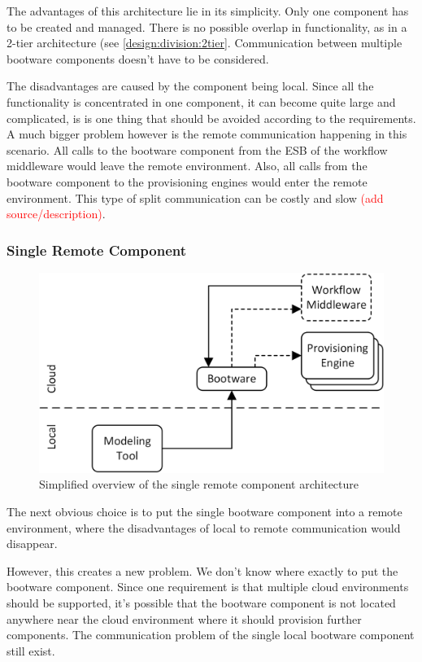 The advantages of this architecture lie in its simplicity.
Only one component has to be created and managed.
There is no possible overlap in functionality, as in a 2-tier architecture (see \autoref{design:division:2tier}.
Communication between multiple bootware components doesn't have to be considered.

The disadvantages are caused by the component being local.
Since all the functionality is concentrated in one component, it can become quite large and complicated, is is one thing that should be avoided according to the requirements.
A much bigger problem however is the remote communication happening in this scenario.
All calls to the bootware component from the ESB of the workflow middleware would leave the remote environment.
Also, all calls from the bootware component to the provisioning engines would enter the remote environment.
This type of split communication can be costly and slow \textcolor{red}{(add source/description)}.

\subsubsection{Single Remote Component}

\begin{figure}[!htbp]
	\centering
	\includegraphics[resolution=600]{design/assets/simple_remote}
	\caption{Simplified overview of the single remote component architecture}
	\label{image:single_remote}
\end{figure}

The next obvious choice is to put the single bootware component into a remote environment, where the disadvantages of local to remote communication would disappear.

However, this creates a new problem.
We don't know where exactly to put the bootware component.
Since one requirement is that multiple cloud environments should be supported, it's possible that the bootware component is not located anywhere near the cloud environment where it should provision further components.
The communication problem of the single local bootware component still exist.

